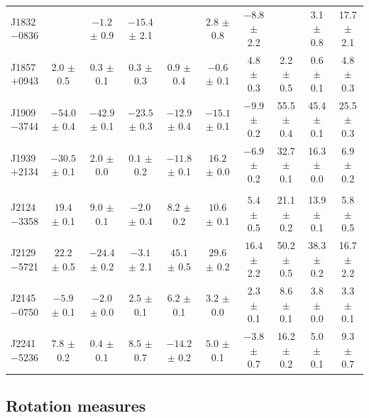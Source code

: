 \documentclass[useAMS,usenatbib]{mn2e}
\begin{document}
\begin{table}
\begin{center}
\begin{tabular}{lccccccccc}
J1832$-$0836 &                  & $-1.2 $ $\pm$ 0.9 & $-15.4$ $\pm$ 2.1 &                   & $2.8  $ $\pm$ 0.8 & $-8.8 $ $\pm$ 2.2 &                & 3.1  $\pm$ 0.8 & 17.7 $\pm$ 2.1 \\
J1857$+$0943 &$2.0  $ $\pm$ 0.5 & $0.3  $ $\pm$ 0.1 & $0.3  $ $\pm$ 0.3 & $0.9  $ $\pm$ 0.4 & $-0.6 $ $\pm$ 0.1 & $4.8  $ $\pm$ 0.3 & 2.2  $\pm$ 0.5 & 0.6  $\pm$ 0.1 & 4.8  $\pm$ 0.3 \\
J1909$-$3744 &$-54.0$ $\pm$ 0.4 & $-42.9$ $\pm$ 0.1 & $-23.5$ $\pm$ 0.3 & $-12.9$ $\pm$ 0.4 & $-15.1$ $\pm$ 0.1 & $-9.9 $ $\pm$ 0.2 & 55.5 $\pm$ 0.4 & 45.4 $\pm$ 0.1 & 25.5 $\pm$ 0.3 \\
J1939$+$2134 &$-30.5$ $\pm$ 0.1 & $2.0  $ $\pm$ 0.0 & $0.1  $ $\pm$ 0.2 & $-11.8$ $\pm$ 0.1 & $16.2 $ $\pm$ 0.0 & $-6.9 $ $\pm$ 0.2 & 32.7 $\pm$ 0.1 & 16.3 $\pm$ 0.0 & 6.9  $\pm$ 0.2 \\
             &                &                 &                &                   &                   &                   &                &                &                 \\
J2124$-$3358 &$19.4 $ $\pm$ 0.1 & $9.0  $ $\pm$ 0.1 & $-2.0 $ $\pm$ 0.4 & $8.2  $ $\pm$ 0.2 & $10.6 $ $\pm$ 0.1 & $5.4  $ $\pm$ 0.5 & 21.1 $\pm$ 0.2 & 13.9 $\pm$ 0.1 & 5.8  $\pm$ 0.5 \\
J2129$-$5721 &$22.2 $ $\pm$ 0.5 & $-24.4$ $\pm$ 0.2 & $-3.1 $ $\pm$ 2.1 & $45.1 $ $\pm$ 0.5 & $29.6 $ $\pm$ 0.2 & $16.4 $ $\pm$ 2.2 & 50.2 $\pm$ 0.5 & 38.3 $\pm$ 0.2 & 16.7 $\pm$ 2.2 \\
J2145$-$0750 &$-5.9 $ $\pm$ 0.1 & $-2.0 $ $\pm$ 0.0 & $2.5  $ $\pm$ 0.1 & $6.2  $ $\pm$ 0.1 & $3.2  $ $\pm$ 0.0 & $2.3  $ $\pm$ 0.1 & 8.6  $\pm$ 0.1 & 3.8  $\pm$ 0.0 & 3.3  $\pm$ 0.1 \\
J2241$-$5236 &$7.8  $ $\pm$ 0.2 & $0.4  $ $\pm$ 0.1 & $8.5  $ $\pm$ 0.7 & $-14.2$ $\pm$ 0.2 & $5.0  $ $\pm$ 0.1 & $-3.8 $ $\pm$ 0.7 & 16.2 $\pm$ 0.2 & 5.0  $\pm$ 0.1 & 9.3  $\pm$ 0.7 \\
\hline
\end{tabular}
\end{center}
\end{table}

\subsection{Rotation measures}

\end{document}
